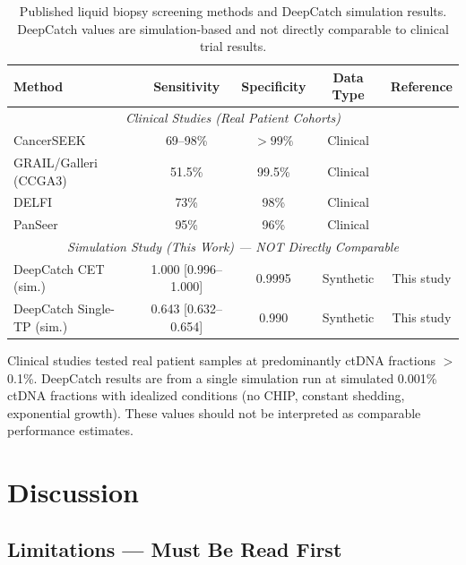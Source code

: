 \documentclass[10pt,a4paper]{article}
\begin{document}
\begin{table}[H]
\centering
\caption{Published liquid biopsy screening methods and DeepCatch simulation results. DeepCatch values are simulation-based and not directly comparable to clinical trial results.}
\label{tab:benchmark}
\begin{tabular}{l c c c c}
\toprule
\textbf{Method} & \textbf{Sensitivity} & \textbf{Specificity} & \textbf{Data Type} & \textbf{Reference} \\
\midrule
\multicolumn{5}{c}{\textit{Clinical Studies (Real Patient Cohorts)}} \\
\midrule
CancerSEEK & 69--98\% & $>99\%$ & Clinical & \cite{cohen2018detection} \\
GRAIL/Galleri (CCGA3) & 51.5\% & 99.5\% & Clinical & \cite{klein2021clinical} \\
DELFI & 73\% & 98\% & Clinical & \cite{cristiano2019genome} \\
PanSeer & 95\% & 96\% & Clinical & \cite{chen2020non} \\
\midrule
\multicolumn{5}{c}{\textit{Simulation Study (This Work) — NOT Directly Comparable}} \\
\midrule
DeepCatch CET (sim.) & 1.000 [0.996--1.000] & 0.9995 & Synthetic & This study \\
DeepCatch Single-TP (sim.) & 0.643 [0.632--0.654] & 0.990 & Synthetic & This study \\
\bottomrule
\end{tabular}
\vspace{0.3cm}
\footnotesize{Clinical studies tested real patient samples at predominantly ctDNA fractions $>$0.1\%. DeepCatch results are from a single simulation run at simulated 0.001\% ctDNA fractions with idealized conditions (no CHIP, constant shedding, exponential growth). These values should not be interpreted as comparable performance estimates.}
\end{table}


\section{Discussion}

\subsection{Limitations — Must Be Read First}
\label{sec:limitations}
\end{document}
